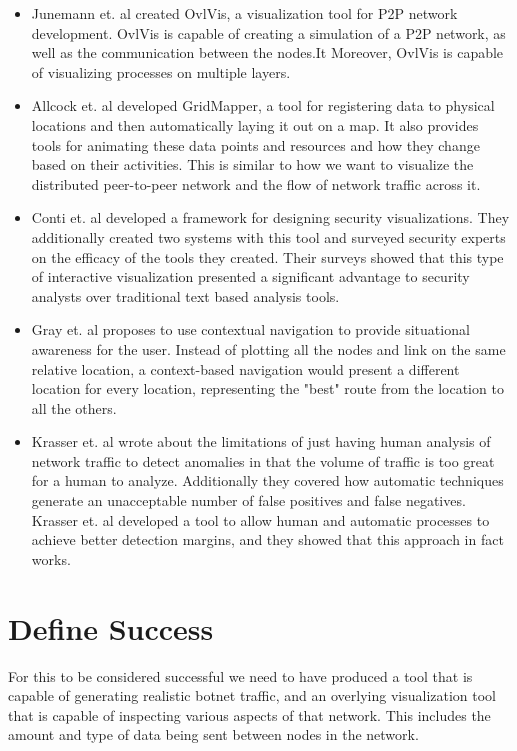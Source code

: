 \documentclass{proc}
\begin{document}
\begin{itemize}

\item{Junemann et. al created OvlVis, a visualization tool for P2P network development. OvlVis is capable of creating a simulation of a P2P network, as well as the communication between the nodes.It Moreover, OvlVis is capable of visualizing processes on multiple layers. \cite{ovlvis}}

\item{Allcock et. al developed GridMapper, a tool for registering data to physical locations and then automatically laying it out on a map. It also provides tools for animating these data points and resources and how they change based on their activities. This is similar to how we want to visualize the distributed peer-to-peer network and the flow of network traffic across it.\cite{gridmapper}}

\item{Conti et. al developed a framework for designing security visualizations. They additionally created two systems with this tool and surveyed security experts on the efficacy of the tools they created. Their surveys showed that this type of interactive visualization presented a significant advantage to security analysts over traditional text based analysis tools.\cite{packet_vis}}

\item{Gray et. al proposes to use contextual navigation to provide situational awareness for the user. Instead of plotting all the nodes and link on the same relative location, a context-based navigation would present a different location for every location, representing the "best" route from the location to all the others.\cite{context_net}}

\item{Krasser et. al wrote about the limitations of just having human analysis of network traffic to detect anomalies in that the volume of traffic is too great for a human to analyze. Additionally they covered how automatic techniques generate an unacceptable number of false positives and false negatives. Krasser et. al developed a tool to allow human and automatic processes to achieve better detection margins, and they showed that this approach in fact works.\cite{real_time}}


\end{itemize}


\section{Define Success}

For this to be considered successful we need to have produced a tool that is capable of generating realistic botnet traffic, and an overlying visualization tool that is capable of inspecting various aspects of that network. This includes the amount and type of data being sent between nodes in the network.



\nocite{*}



\end{document}
